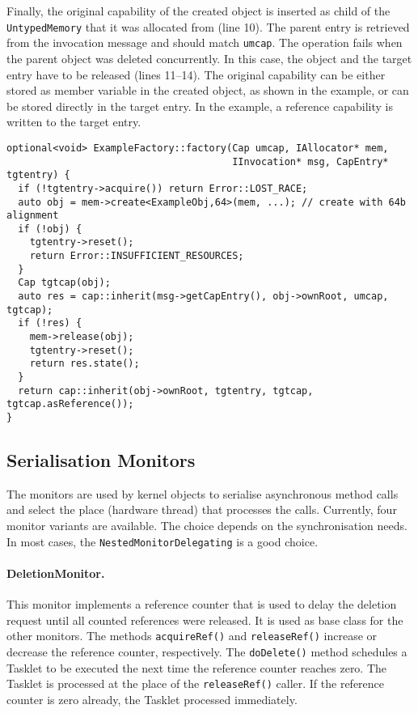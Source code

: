 Finally, the original capability of the created object is inserted as
child of the \texttt{UntypedMemory} that it was allocated from (line
10).  The parent entry is retrieved from the invocation message and
should match \texttt{umcap}.  The operation fails when the parent
object was deleted concurrently.  In this case, the object and the
target entry have to be released (lines 11--14).  The original
capability can be either stored as member variable in the created
object, as shown in the example, or can be stored directly in the
target entry.  In the example, a reference capability is written to the
target entry.

\begin{lstlisting}[float, label=lst:factory, caption=An example factory implementation.]
optional<void> ExampleFactory::factory(Cap umcap, IAllocator* mem,
                                       IInvocation* msg, CapEntry* tgtentry) {
  if (!tgtentry->acquire()) return Error::LOST_RACE;
  auto obj = mem->create<ExampleObj,64>(mem, ...); // create with 64b alignment
  if (!obj) {
    tgtentry->reset();
    return Error::INSUFFICIENT_RESOURCES;
  }
  Cap tgtcap(obj);
  auto res = cap::inherit(msg->getCapEntry(), obj->ownRoot, umcap, tgtcap);
  if (!res) {
    mem->release(obj);
    tgtentry->reset();
    return res.state();
  }
  return cap::inherit(obj->ownRoot, tgtentry, tgtcap, tgtcap.asReference());
}
\end{lstlisting}



\subsection{Serialisation Monitors}

The monitors are used by kernel objects to serialise asynchronous
method calls and select the place (hardware thread) that processes the
calls.  Currently, four monitor variants are available.  The choice
depends on the synchronisation needs.  In most cases, the
\texttt{NestedMonitorDelegating} is a good choice.

\paragraph{DeletionMonitor.}
This monitor implements a reference counter that is used to delay the
deletion request until all counted references were released.  It is
used as base class for the other monitors.  The methods
\texttt{acquireRef()} and \texttt{releaseRef()} increase or decrease
the reference counter, respectively.  The \texttt{doDelete()} method
schedules a Tasklet to be executed the next time the reference counter
reaches zero.  The Tasklet is processed at the place of the
\texttt{releaseRef()} caller.  If the reference counter is zero
already, the Tasklet processed immediately.

